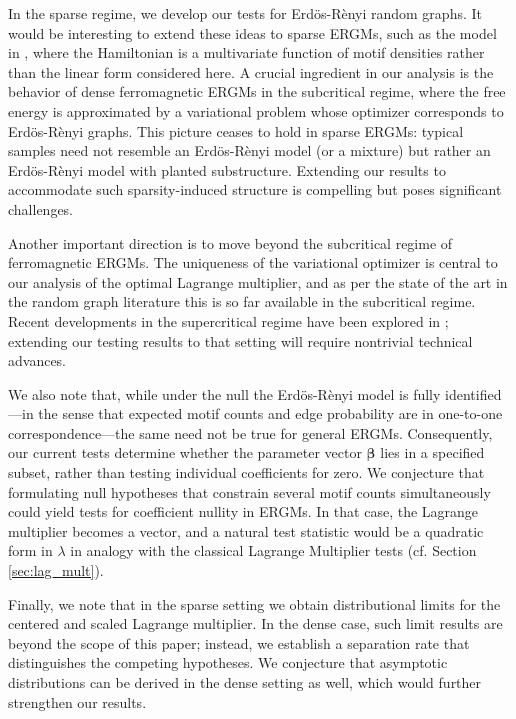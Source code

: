 \documentclass[12pt]{article}
\def\er{ Erd{\"o}s-R{\`e}nyi }
\numberwithin{equation}{section}
\def\bbeta{\boldsymbol{\beta}}
\begin{document}
In the sparse regime, we develop our tests for \er random graphs. It would be interesting to extend these ideas to sparse ERGMs, such as the model in \cite{cook2024typical}, where the Hamiltonian is a multivariate function of motif densities rather than the linear form considered here. A crucial ingredient in our analysis is the behavior of dense ferromagnetic ERGMs in the subcritical regime, where the free energy is approximated by a variational problem whose optimizer corresponds to \er{} graphs. This picture ceases to hold in sparse ERGMs: typical samples need not resemble an \er{} model (or a mixture) but rather an \er{} model with planted substructure. Extending our results to accommodate such sparsity-induced structure is compelling but poses significant challenges.

Another important direction is to move beyond the subcritical regime of ferromagnetic ERGMs. The uniqueness of the variational optimizer is central to our analysis of the optimal Lagrange multiplier, and as per the state of the art in the random graph literature this is so far available in the subcritical regime. Recent developments in the supercritical regime have been explored in \cite{winstein2025quantitative}; extending our testing results to that setting will require nontrivial technical advances.

We also note that, while under the null the \er model is fully identified—in the sense that expected motif counts and edge probability are in one-to-one correspondence—the same need not be true for general ERGMs. Consequently, our current tests determine whether the parameter vector 
$\bbeta$ lies in a specified subset, rather than testing individual coefficients for zero. We conjecture that formulating null hypotheses that constrain several motif counts simultaneously could yield tests for coefficient nullity in ERGMs. In that case, the Lagrange multiplier becomes a vector, and a natural test statistic would be a quadratic form in $\lambda$ in analogy with the classical Lagrange Multiplier tests (cf. Section \ref{sec:lag_mult}).

Finally, we note that in the sparse setting we obtain distributional limits for the centered and scaled Lagrange multiplier. In the dense case, such limit results are beyond the scope of this paper; instead, we establish a separation rate that distinguishes the competing hypotheses. We conjecture that asymptotic distributions can be derived in the dense setting as well, which would further strengthen our results.
\end{document}
